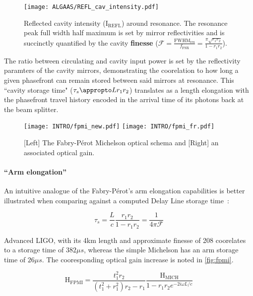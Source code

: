 \begin{figure}[H]
\texttt{[image: ALGAAS/REFL\_cav\_intensity.pdf]}
\caption{Reflected cavity intensity (I$_\mathrm{REFL}$) around resonance. The resonance peak full width half maximum is set by mirror reflectivities and is succinctly quantified by the cavity \textbf{finesse} ($\mathscr{F} = \frac{\mathrm{FWHM}_\mathrm{res}}{f_\mathrm{FSR}} = \frac{\pi \sqrt{r_1 r_2}}{1-r_1 r_2}$).}
\label{fig:cav_length_response_DCpow}
\end{figure}

The ratio between circulating and cavity input power is set by the reflectivity paramters of the cavity mirrors, demonstrating the coorelation to how long a given phasefront can remain stored between said mirrors at resonance. This ``cavity storage time" ($\tau_s \appropto L r_1 r_2$) translates as a length elongation with the phasefront travel history encoded in the arrival time of its photons back at the beam splitter.

\begin{figure}[ht!]
  \begin{subcaptiongroup}{\texttt{[image: INTRO/fpmi\_new.pdf]}}
  \texttt{[image: INTRO/fpmi\_fr.pdf]}
  \end{subcaptiongroup}
  \hfill
  \caption{[Left] The Fabry-P\'{e}rot Michelson optical schema and [Right] an associated optical gain.}
  \label{fig:fpmi}
\end{figure}

\paragraph{``Arm elongation''}

An intuitive analogue of the Fabry-P\'{e}rot's arm elongation capabilities is better illustrated when comparing against a computed Delay Line storage time~\cite{saulson:2017}:

\begin{equation}
	\tau_s = \frac{L}{c} \frac{r_1r_2}{1-r_1r_2} = \frac{1}{4 \pi \mathscr{F}}
\end{equation}

Advanced LIGO, with its 4km length and approximate finesse of 208 coorelates to a storage time of $382\mu s$, whereas the simple Michelson has an arm storage time of $26 \mu s$. The cooresponding optical gain increase is noted in \autoref{fig:fpmi}. 

\begin{equation}
	\mathrm{H_{FPMI}} = \frac{t_1 ^2 r_2}{(t_1^2 + r_1^2)r_2 - r_1} \frac{\mathrm{H_{MICH}}}{1 - r_1 r_2 e^{-2i \omega L / c}}
\end{equation}

